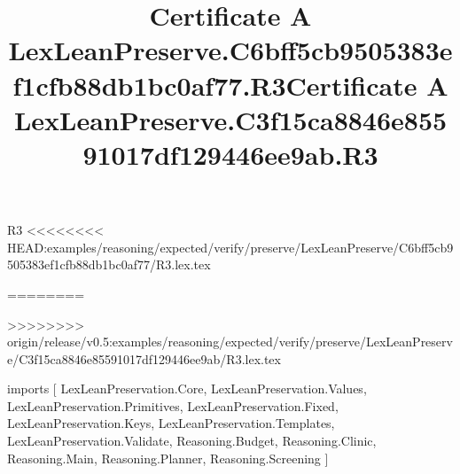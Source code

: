 \begin{lexlean}{R3}
<<<<<<<< HEAD:examples/reasoning/expected/verify/preserve/LexLeanPreserve/C6bff5cb9505383ef1cfb88db1bc0af77/R3.lex.tex
\title{Certificate A LexLeanPreserve.C6bff5cb9505383ef1cfb88db1bc0af77.R3}
========
\title{Certificate A LexLeanPreserve.C3f15ca8846e85591017df129446ee9ab.R3}
>>>>>>>> origin/release/v0.5:examples/reasoning/expected/verify/preserve/LexLeanPreserve/C3f15ca8846e85591017df129446ee9ab/R3.lex.tex
\begin{coremodule}
imports [
  LexLeanPreservation.Core,
  LexLeanPreservation.Values,
  LexLeanPreservation.Primitives,
  LexLeanPreservation.Fixed,
  LexLeanPreservation.Keys,
  LexLeanPreservation.Templates,
  LexLeanPreservation.Validate,
  Reasoning.Budget,
  Reasoning.Clinic,
  Reasoning.Main,
  Reasoning.Planner,
  Reasoning.Screening
]


\end{coremodule}
\end{lexlean}

